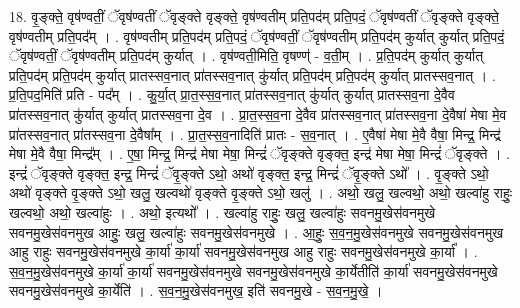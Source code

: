 \documentclass[17pt]{extarticle}
\begin{document}
18. वृ॒ङ्क्ते॒ वृष॑ण्वतीं॒ ॅवृष॑ण्वतीं ॅवृङ्क्ते वृङ्क्ते॒ वृष॑ण्वतीम् प्रति॒पद॑म् प्रति॒पदं॒ ॅवृष॑ण्वतीं ॅवृङ्क्ते वृङ्क्ते॒ वृष॑ण्वतीम् प्रति॒पद᳚म् । . वृष॑ण्वतीम् प्रति॒पद॑म् प्रति॒पदं॒ ॅवृष॑ण्वतीं॒ ॅवृष॑ण्वतीम् प्रति॒पद॑म् कुर्यात् कुर्यात् प्रति॒पदं॒ ॅवृष॑ण्वतीं॒ ॅवृष॑ण्वतीम् प्रति॒पद॑म् कुर्यात् । . वृष॑ण्वती॒मिति॒ वृषण्ण्॑ - व॒ती॒म् । . प्र॒ति॒पद॑म् कुर्यात् कुर्यात् प्रति॒पद॑म् प्रति॒पद॑म् कुर्यात् प्रातस्सव॒नात् प्रा॑तस्सव॒नात् कु॑र्यात् प्रति॒पद॑म् प्रति॒पद॑म् कुर्यात् प्रातस्सव॒नात् । . प्र॒ति॒पद॒मिति॑ प्रति - पद᳚म् । . कु॒र्या॒त् प्रा॒त॒स्स॒व॒नात् प्रा॑तस्सव॒नात् कु॑र्यात् कुर्यात् प्रातस्सव॒ना दे॒वैव प्रा॑तस्सव॒नात् कु॑र्यात् कुर्यात् प्रातस्सव॒ना दे॒व । . प्रा॒त॒स्स॒व॒ना दे॒वैव प्रा॑तस्सव॒नात् प्रा॑तस्सव॒ना दे॒वैषा॑ मेषा मे॒व प्रा॑तस्सव॒नात् प्रा॑तस्सव॒ना दे॒वैषा᳚म् । . प्रा॒त॒स्स॒व॒नादिति॑ प्रातः - स॒व॒नात् । . ए॒वैषा॑ मेषा मे॒वै वैषा॒ मिन्द्र॒ मिन्द्र॑ मेषा मे॒वै वैषा॒ मिन्द्र᳚म् । . ए॒षा॒ मिन्द्र॒ मिन्द्र॑ मेषा मेषा॒ मिन्द्रं॑ ॅवृङ्क्ते वृङ्क्त॒ इन्द्र॑ मेषा मेषा॒ मिन्द्रं॑ ॅवृङ्क्ते । . इन्द्रं॑ ॅवृङ्क्ते वृङ्क्त॒ इन्द्र॒ मिन्द्रं॑ ॅवृ॒ङ्क्ते ऽथो॒ अथो॑ वृङ्क्त॒ इन्द्र॒ मिन्द्रं॑ ॅवृ॒ङ्क्ते ऽथो᳚ । . वृ॒ङ्क्ते ऽथो॒ अथो॑ वृङ्क्ते वृ॒ङ्क्ते ऽथो॒ खलु॒ खल्वथो॑ वृङ्क्ते वृ॒ङ्क्ते ऽथो॒ खलु॑ । . अथो॒ खलु॒ खल्वथो॒ अथो॒ खल्वा॑हु राहुः॒ खल्वथो॒ अथो॒ खल्वा॑हुः । . अथो॒ इत्यथो᳚ । . खल्वा॑हु राहुः॒ खलु॒ खल्वा॑हुः सवनमु॒खेस॑वनमुखे सवनमु॒खेस॑वनमुख आहुः॒ खलु॒ खल्वा॑हुः सवनमु॒खेस॑वनमुखे । . आ॒हुः॒ स॒व॒न॒मु॒खेस॑वनमुखे सवनमु॒खेस॑वनमुख आहु राहुः सवनमु॒खेस॑वनमुखे का॒र्या॑ का॒र्या॑ सवनमु॒खेस॑वनमुख आहु राहुः सवनमु॒खेस॑वनमुखे का॒र्या᳚ । . स॒व॒न॒मु॒खेस॑वनमुखे का॒र्या॑ का॒र्या॑ सवनमु॒खेस॑वनमुखे सवनमु॒खेस॑वनमुखे का॒र्येतीति॑ का॒र्या॑ सवनमु॒खेस॑वनमुखे सवनमु॒खेस॑वनमुखे का॒र्येति॑ । . स॒व॒न॒मु॒खेस॑वनमुख॒ इति॑ सवनमु॒खे - स॒व॒न॒मु॒खे॒ । \newline
\end{document}

